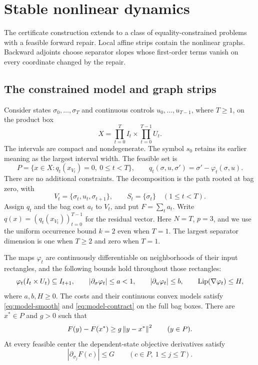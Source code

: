 \section{Stable nonlinear dynamics}\label{sec:dynamics}

The certificate construction extends to a class of equality-constrained
problems with a feasible forward repair. Local affine strips contain the
nonlinear graphs. Backward adjoints choose separator slopes whose
first-order terms vanish on every coordinate changed by the repair.

\subsection{The constrained model and graph strips}

Consider states $\sigma_0,\ldots,\sigma_T$ and continuous controls
$u_0,\ldots,u_{T-1}$, where $T\ge1$, on the product box
\[
 X=\prod_{t=0}^T I_t\times\prod_{t=0}^{T-1}U_t.
\]
The intervals are compact and nondegenerate. The symbol $s_0$ retains its
earlier meaning as the largest interval width. The feasible set is
\begin{equation}\label{eq:dynamics-feasible}
 P=\{x\in X:q_t(x_{V_t})=0,\ 0\le t<T\},\qquad
 q_t(\sigma,u,\sigma')=\sigma'-\varphi_t(\sigma,u).
\end{equation}
There are no additional constraints. The decomposition is the path rooted
at bag zero, with
\[
 V_t=\{\sigma_t,u_t,\sigma_{t+1}\},\qquad
 S_t=\{\sigma_t\}\quad(1\le t<T).
\]
Assign $q_t$ and the bag cost $a_t$ to $V_t$, and put $F=\sum_ta_t$.
Write $q(x)=(q_t(x_{V_t}))_{t=0}^{T-1}$ for the residual vector.
Here $N=T$, $p=3$, and we use the uniform occurrence bound $k=2$ even
when $T=1$. The largest separator dimension is one when $T\ge2$ and zero
when $T=1$.

\begin{assumption}\label{ass:dynamics}
The maps $\varphi_t$ are continuously differentiable on neighborhoods of
their input rectangles, and the following bounds hold throughout those
rectangles:
\begin{equation}\label{eq:dynamics-promises}
 \varphi_t(I_t\times U_t)\subseteq I_{t+1},\qquad
 |\partial_\sigma\varphi_t|\le a<1,\qquad
 |\partial_u\varphi_t|\le b,\qquad
 \operatorname{Lip}(\nabla\varphi_t)\le H,
\end{equation}
where $a,b,H\ge0$. The costs and their continuous convex models satisfy
\eqref{eq:model-smooth} and \eqref{eq:model-contract} on the full bag
boxes. There are $x^*\in P$ and $g>0$ such that
\begin{equation}\label{eq:dynamics-growth}
 F(y)-F(x^*)\ge g\left\lVert y-x^*\right\rVert^2\qquad(y\in P).
\end{equation}
At every feasible center the dependent-state objective derivatives satisfy
\begin{equation}\label{eq:dynamics-state-gradient}
 |\partial_{\sigma_j}F(c)|\le G
 \qquad(c\in P,\ 1\le j\le T).
\end{equation}
\end{assumption}


